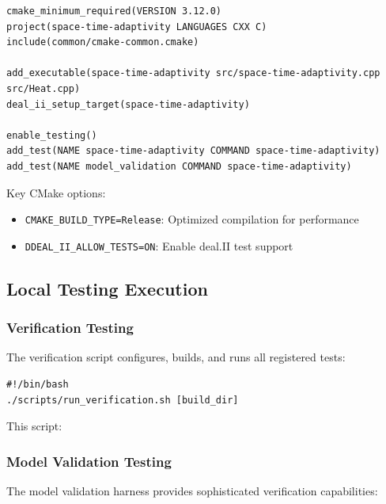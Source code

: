 \documentclass[11pt,a4paper]{article}
\begin{document}
\begin{lstlisting}
cmake_minimum_required(VERSION 3.12.0)
project(space-time-adaptivity LANGUAGES CXX C)
include(common/cmake-common.cmake)

add_executable(space-time-adaptivity src/space-time-adaptivity.cpp src/Heat.cpp)
deal_ii_setup_target(space-time-adaptivity)

enable_testing()
add_test(NAME space-time-adaptivity COMMAND space-time-adaptivity)
add_test(NAME model_validation COMMAND space-time-adaptivity)
\end{lstlisting}

Key CMake options:
\begin{itemize}
    \item \texttt{CMAKE\_BUILD\_TYPE=Release}: Optimized compilation for performance
    \item \texttt{DDEAL\_II\_ALLOW\_TESTS=ON}: Enable deal.II test support
\end{itemize}

\subsection{Local Testing Execution}

\subsubsection{Verification Testing}
The verification script configures, builds, and runs all registered tests:

\begin{lstlisting}
#!/bin/bash
./scripts/run_verification.sh [build_dir]
\end{lstlisting}

This script:

\subsubsection{Model Validation Testing}
The model validation harness provides sophisticated verification capabilities:
\end{document}
